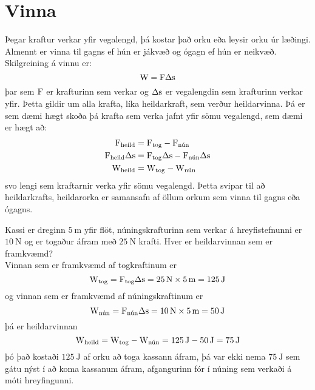 \section{Vinna}
Þegar kraftur verkar yfir vegalengd, þá kostar það orku eða leysir orku úr
læðingi. Almennt er vinna til gagns ef hún er jákvæð og ógagn
ef hún er neikvæð. Skilgreining á vinnu er:
\begin{equation}
	\textrm{W} = \textrm{F} \Delta\textrm{s}
\end{equation}
þar sem $\textrm{F}$ er krafturinn sem verkar og $\Delta\textrm{s}$ er vegalengdin
sem krafturinn verkar yfir. Þetta gildir um alla krafta, líka heildarkraft, sem
verður heildarvinna. Þá er sem dæmi hægt skoða þá krafta sem verka jafnt
yfir sömu vegalengd, sem dæmi er hægt að:
\begin{align*}
	\textrm{F}_\text{heild} &= \textrm{F}_\text{tog} - \textrm{F}_\text{nún} \\
	\textrm{F}_\text{heild}\Delta\textrm{s} &= 
		\textrm{F}_\text{tog}\Delta\textrm{s} - \textrm{F}_\text{nún}\Delta\textrm{s} \\
	\textrm{W}_\text{heild} &= \textrm{W}_\text{tog} - \textrm{W}_\text{nún}
\end{align*}
svo lengi sem kraftarnir verka yfir sömu vegalengd. Þetta svipar til að
heildarkrafts, heildarorka er samansafn af öllum orkum sem vinna til gagns eða
ógagns.
%
\begin{formalexample}
Kassi er dreginn $\SI{5}{\m}$ yfir flöt, núningskrafturinn sem verkar á hreyfistefnunni er
$\SI{10}{\N}$ og er togaður áfram með $\SI{25}{\N}$ krafti.
Hver er heildarvinnan sem er framkvæmd?
\\[4 ex]
Vinnan sem er framkvæmd af togkraftinum er
\[
	\uworkw_\text{tog} = \uforce_\text{tog} \Delta\ulengths 
		= \SI{25}{\N} \times \SI{5}{\m}
		= \SI{125}{\J}
\]
og vinnan sem er framkvæmd af núningskraftinum er
\[
	\uworkw_\text{nún} = \uforce_\text{nún} \Delta\ulengths 
		= \SI{10}{\N} \times \SI{5}{\m}
		= \SI{50}{\J}
\]
þá er heildarvinnan
\[
	\uworkw_\text{heild} = \uworkw_\text{tog} - \uworkw_\text{nún}
		= \SI{125}{\J} - \SI{50}{\J}
		= \SI{75}{\J}
\]
þó það kostaði $\SI{125}{\J}$ af orku að toga kassann áfram, þá var ekki
nema $\SI{75}{\J}$ sem gátu nýst í að koma kassanum áfram, afgangurinn fór í
núning sem verkaði á móti hreyfingunni.
\end{formalexample}

